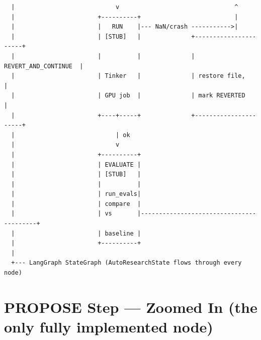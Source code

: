 \documentclass[11pt, letterpaper]{article}
\begin{document}
\begin{verbatim}
  |                            v                                ^
  |                       +----------+                          |
  |                       |   RUN    |--- NaN/crash ----------->|
  |                       | [STUB]   |              +----------------------+
  |                       |          |              | REVERT_AND_CONTINUE  |
  |                       | Tinker   |              | restore file,        |
  |                       | GPU job  |              | mark REVERTED        |
  |                       +----+-----+              +----------------------+
  |                            | ok
  |                            v
  |                       +----------+
  |                       | EVALUATE |
  |                       | [STUB]   |
  |                       |          |
  |                       | run_evals|
  |                       | compare  |
  |                       | vs       |-----------------------------------------+
  |                       | baseline |
  |                       +----------+
  |
  +--- LangGraph StateGraph (AutoResearchState flows through every node)
\end{verbatim}

\section{PROPOSE Step — Zoomed In (the only fully implemented node)}
\end{document}
